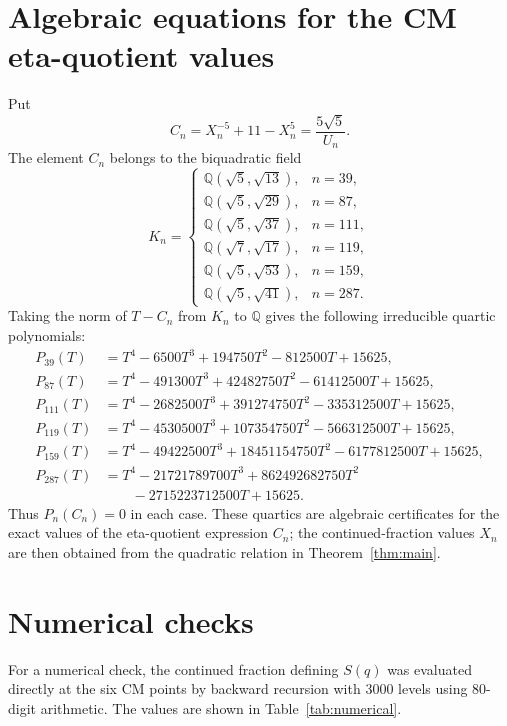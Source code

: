 \documentclass[11pt,a4paper]{article}
\begin{document}
\section{Algebraic equations for the CM eta-quotient values}
Put
\[
C_n=X_n^{-5}+11-X_n^5=\frac{5\sqrt5}{U_n}.
\]
The element $C_n$ belongs to the biquadratic field
\[
K_n=\begin{cases}
\mathbb Q(\sqrt5,\sqrt{13}),&n=39,\\
\mathbb Q(\sqrt5,\sqrt{29}),&n=87,\\
\mathbb Q(\sqrt5,\sqrt{37}),&n=111,\\
\mathbb Q(\sqrt7,\sqrt{17}),&n=119,\\
\mathbb Q(\sqrt5,\sqrt{53}),&n=159,\\
\mathbb Q(\sqrt5,\sqrt{41}),&n=287.
\end{cases}
\]
Taking the norm of $T-C_n$ from $K_n$ to $\mathbb Q$ gives the following irreducible quartic polynomials:
\begin{align*}
P_{39}(T)&=T^4-6500T^3+194750T^2-812500T+15625,\\
P_{87}(T)&=T^4-491300T^3+42482750T^2-61412500T+15625,\\
P_{111}(T)&=T^4-2682500T^3+391274750T^2-335312500T+15625,\\
P_{119}(T)&=T^4-4530500T^3+107354750T^2-566312500T+15625,\\
P_{159}(T)&=T^4-49422500T^3+18451154750T^2-6177812500T+15625,\\
P_{287}(T)&=T^4-21721789700T^3+862492682750T^2\\
&\qquad -2715223712500T+15625.
\end{align*}
Thus $P_n(C_n)=0$ in each case.  These quartics are algebraic certificates for the exact values of the eta-quotient expression $C_n$; the continued-fraction values $X_n$ are then obtained from the quadratic relation in Theorem~\ref{thm:main}.

\section{Numerical checks}
For a numerical check, the continued fraction defining $S(q)$ was evaluated directly at the six CM points by backward recursion with 3000 levels using 80-digit arithmetic.  The values are shown in Table~\ref{tab:numerical}.
\end{document}
